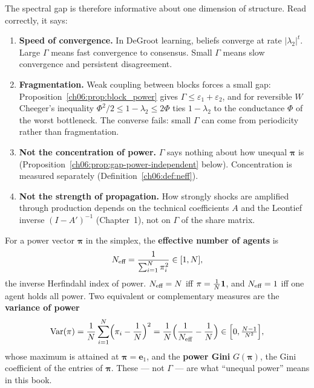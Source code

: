 \documentclass[../structural_economics_book.tex]{subfiles}
\begin{document}
The spectral gap is therefore informative about one dimension of structure. Read correctly, it says:
\begin{enumerate}
\item \textbf{Speed of convergence.} In DeGroot learning, beliefs converge at rate $|\lambda_2|^t$. Large $\Gamma$ means fast convergence to consensus. Small $\Gamma$ means slow convergence and persistent disagreement.

\item \textbf{Fragmentation.} Weak coupling between blocks forces a small gap: Proposition~\ref{ch06:prop:block_power} gives $\Gamma \leq \varepsilon_1 + \varepsilon_2$, and for reversible $W$ Cheeger's inequality $\Phi^2/2 \leq 1 - \lambda_2 \leq 2\Phi$ ties $1-\lambda_2$ to the conductance $\Phi$ of the worst bottleneck. The converse fails: small $\Gamma$ can come from periodicity rather than fragmentation.

\item \textbf{Not the concentration of power.} $\Gamma$ says nothing about how unequal $\boldsymbol{\pi}$ is (Proposition~\ref{ch06:prop:gap-power-independent} below). Concentration is measured separately (Definition~\ref{ch06:def:neff}).

\item \textbf{Not the strength of propagation.} How strongly shocks are amplified through production depends on the technical coefficients $A$ and the Leontief inverse $(I - A')^{-1}$ (Chapter~1), not on $\Gamma$ of the share matrix.
\end{enumerate}

\begin{definition}\label{ch06:def:neff}
For a power vector $\boldsymbol{\pi}$ in the simplex, the \textbf{effective number of agents} is
\begin{equation}\label{ch06:eq:neff}
N_{\text{eff}} = \frac{1}{\sum_{i=1}^N \pi_i^2} \in [1, N],
\end{equation}
the inverse Herfindahl index of power. $N_{\text{eff}} = N$ iff $\pi = \frac1N\mathbf{1}$, and $N_{\text{eff}} = 1$ iff one agent holds all power. Two equivalent or complementary measures are the \textbf{variance of power}
\begin{equation}\label{ch06:eq:varpi}
\operatorname{Var}(\pi) = \frac{1}{N}\sum_{i=1}^N\Bigl(\pi_i - \frac1N\Bigr)^2 = \frac{1}{N}\Bigl(\frac{1}{N_{\text{eff}}} - \frac{1}{N}\Bigr) \in \Bigl[0, \tfrac{N-1}{N^2}\Bigr],
\end{equation}
whose maximum is attained at $\boldsymbol{\pi} = \mathbf{e}_1$, and the \textbf{power Gini} $G(\boldsymbol{\pi})$, the Gini coefficient of the entries of $\boldsymbol{\pi}$. These --- not $\Gamma$ --- are what ``unequal power'' means in this book.
\end{definition}
\end{document}
